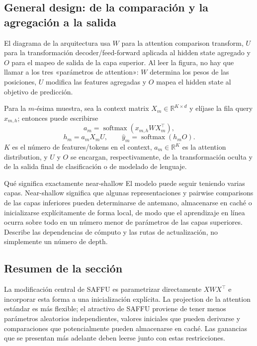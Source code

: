\subsection{General design: de la comparación y la agregación a la salida}

El diagrama de la arquitectura usa $W$ para la attention comparison transform, $U$ para la transformación decoder/feed-forward aplicada al hidden state agregado y $O$ para el mapeo de salida de la capa superior. Al leer la figura, no hay que llamar a los tres «parámetros de attention»: $W$ determina los pesos de las posiciones, $U$ modifica las features agregadas y $O$ mapea el hidden state al objetivo de predicción.


Para la $m$-ésima muestra, sea la context matrix $X_m\in\mathbb{R}^{K\times d}$ y elíjase la fila query $x_{m,h}$; entonces puede escribirse
\[
a_m=\operatorname{softmax}(x_{m,h}WX_m^\top),
\]
\[
h_m=a_mX_mU,\qquad \hat y_m=\operatorname{softmax}(h_mO).
\]
$K$ es el número de features/tokens en el context, $a_m\in\mathbb{R}^{K}$ es la attention distribution, y $U$ y $O$ se encargan, respectivamente, de la transformación oculta y de la salida final de clasificación o de modelado de lenguaje.

\begin{knowledgebox}{Qué significa exactamente near-shallow}
El modelo puede seguir teniendo varias capas. Near-shallow significa que algunas representaciones y pairwise comparisons de las capas inferiores pueden determinarse de antemano, almacenarse en caché o inicializarse explícitamente de forma local, de modo que el aprendizaje en línea ocurra sobre todo en un número menor de parámetros de las capas superiores. Describe las dependencias de cómputo y las rutas de actualización, no simplemente un número de depth.
\end{knowledgebox}


\subsection{Resumen de la sección}

La modificación central de SAFFU es parametrizar directamente $XWX^\top$ e incorporar esta forma a una inicialización explícita. La projection de la attention estándar es más flexible; el atractivo de SAFFU proviene de tener menos parámetros aleatorios independientes, valores iniciales que pueden derivarse y comparaciones que potencialmente pueden almacenarse en caché. Las ganancias que se presentan más adelante deben leerse junto con estas restricciones.

